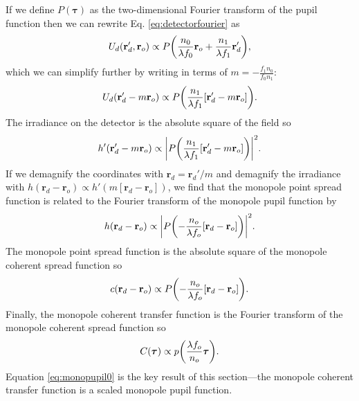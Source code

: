 \documentclass[]{osa-article}
\let\originalleft\left
\let\originalright\right
\renewcommand{\left}{\mathopen{}\mathclose\bgroup\originalleft}
\renewcommand{\right}{\aftergroup\egroup\originalright}
\providecommand{\ro}{\mathbf{\mathbf{r}}_o}
\providecommand{\rd}{\mathbf{r}_d}
\providecommand{\bs}[1]{\boldsymbol{#1}}
\providecommand{\taup}{\bs{\tau}}
\begin{document}
If we define $P(\taup)$ as the two-dimensional Fourier transform of the pupil function
then we can rewrite Eq. \eqref{eq:detectorfourier} as
\begin{align}
  U_d(\rd', \ro) \propto P\left(\frac{n_0}{\lambda f_0}\ro + \frac{n_1}{\lambda f_1}\rd'\right),
\end{align}
which we can simplify further by writing in terms of
$m = -\frac{f_1n_0}{f_0n_1}$:
\begin{align}
  U_d(\rd' - m\ro) \propto P\left(\frac{n_1}{\lambda f_1}[\rd' - m\ro]\right).
\end{align}
The irradiance on the detector is the absolute square of the field so
\begin{align}
  h'(\rd' - m\ro) \propto \left|P\left(\frac{n_1}{\lambda f_1}[\rd' - m\ro]\right)\right|^2.
\end{align}
If we demagnify the coordinates with $\rd = \rd'/m$ and demagnify the irradiance
with $h(\rd - \ro) \propto h'(m[\rd - \ro])$, we find that the monopole point
spread function is related to the Fourier transform of the monopole pupil
function by
\begin{align}
  h(\rd - \ro) \propto \left|P\left(-\frac{n_o}{\lambda f_o}[\rd - \ro]\right)\right|^2.
\end{align}
The monopole point spread function is the absolute square of the monopole
coherent spread function so
\begin{align}
  c(\rd - \ro) \propto P\left(-\frac{n_o}{\lambda f_o}[\rd - \ro]\right).
\end{align}
Finally, the monopole coherent transfer function is the Fourier transform of the
monopole coherent spread function so
\begin{align}
  C(\taup) \propto p\left(\frac{\lambda f_o}{n_o}\taup\right). \label{eq:monopupil0}
\end{align}
Equation \eqref{eq:monopupil0} is the key result of this section---the monopole
coherent transfer function is a scaled monopole pupil function.
\end{document}
